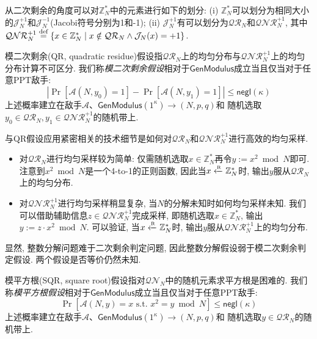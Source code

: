 从二次剩余的角度可以对$\mathbb{Z}_N^*$中的元素进行如下的划分: 
(i) $\mathbb{Z}_N^*$可以划分为相同大小的$\mathcal{J}_N^{+1}$和$\mathcal{J}_N^{-1}$(Jacobi符号分别为1和-1); 
(ii) $\mathcal{J}_N^{+1}$有可以划分为$\mathcal{QR}_N$和$\mathcal{QNR}_N^{+1}$, 
其中$\mathcal{QNR}_N^{+1} \stackrel{\textup{def}}{=} \{x \in \mathbb{Z}_N^* \mid x \notin \mathcal{QR}_N \wedge \mathcal{J}_N(x)=+1\}$.  

\begin{definition}[模二次剩余假设]
模二次剩余(QR, quadratic residue)假设指$\mathcal{QR}_N$上的均匀分布与$\mathcal{QNR}_N^{+1}$上的均匀分布计算不可区分. 
我们称\emph{模二次剩余假设}相对于$\mathsf{GenModulus}$成立当且仅当对于任意PPT敌手:  
\begin{equation*}
|\Pr[\mathcal{A}(N, y_0) = 1] - \Pr[\mathcal{A}(N, y_1) = 1]| \leq \mathsf{negl}(\kappa)
\end{equation*}		
上述概率建立在敌手$\mathcal{A}$、$\mathsf{GenModulus}(1^\kappa) \rightarrow (N, p, q)$和
随机选取$y_0 \in \mathcal{QR}_N, y_1 \in \mathcal{QNR}_N^{+1}$的随机带上. 
\end{definition}

与QR假设应用紧密相关的技术细节是如何对$\mathcal{QR}_N$和$\mathcal{QNR}_N^{+1}$进行高效的均匀采样. 
\begin{itemize}
\item 对$\mathcal{QR}_N$进行均匀采样较为简单: 仅需随机选取$x \in \mathbb{Z}_N^*$再令$y:= x^2 \bmod N$即可. 
	注意到$x^2 \bmod N$是一个4-to-1的正则函数, 因此当$x \xleftarrow{\textup{\tiny R}} \mathbb{Z}_N^*$时, 输出$y$服从$\mathcal{QR}_N$上的均匀分布. 

\item 对$\mathcal{QNR}_N^{+1}$进行均匀采样稍显复杂, 当$N$的分解未知时如何均匀采样未知. 
	我们可以借助辅助信息$z \in \mathcal{QNR}_N^{+1}$完成采样, 即随机选取$x \in \mathbb{Z}_N^*$, 
	输出$y:= z \cdot x^2 \bmod N$. 可以验证, 当$x \xleftarrow{\textup{\tiny R}} \mathbb{Z}_N^*$时, 输出$y$服从$\mathcal{QNR}_N^{+1}$上的均匀分布. 
\end{itemize}


\begin{remark}
显然, 整数分解问题难于二次剩余判定问题, 因此整数分解假设弱于模二次剩余判定假设. 
两个假设是否等价仍然未知. 
\end{remark}

\begin{definition}[模平方根假设]
模平方根(SQR, square root)假设指对$\mathcal{QN}_N$中的随机元素求平方根是困难的. 
我们称\emph{模平方根假设}相对于$\mathsf{GenModulus}$成立当且仅当对于任意PPT敌手:  
\begin{equation*}
\Pr[\mathcal{A}(N, y) = x \text{~s.t.~} x^2 = y \bmod N] \leq \mathsf{negl}(\kappa)
\end{equation*}	
上述概率建立在敌手$\mathcal{A}$、$\mathsf{GenModulus}(1^\kappa) \rightarrow (N, p, q)$和
随机选取$y \in \mathcal{QR}_N$的随机带上. 
\end{definition}

